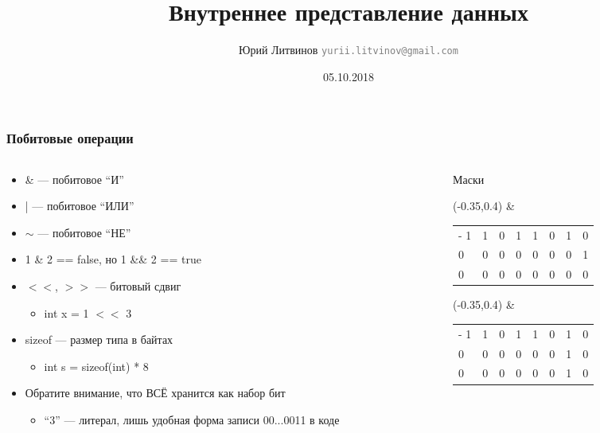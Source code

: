 \documentclass[xetex,mathserif,serif]{beamer}
\title{Внутреннее представление данных}
\author[Юрий Литвинов]{Юрий Литвинов \newline \textcolor{gray}{\small\texttt{yurii.litvinov@gmail.com}}}
\date{05.10.2018}
\begin{document}
	
	\frame{\titlepage}
	
	\begin{frame}
		\frametitle{Побитовые операции}
		\begin{columns}
			\begin{column}{0.6\textwidth}
				\begin{itemize}
					\item \& --- побитовое ``И''
					\item | --- побитовое ``ИЛИ''
					\item $\sim$ --- побитовое ``НЕ''
					\item 1 \& 2 == false, но 1 \&\& 2 == true
					\item $<<$, $>>$ --- битовый сдвиг
					\begin{itemize}
						\item int x = 1 $<<$ 3
					\end{itemize}
					\item sizeof --- размер типа в байтах
					\begin{itemize}
						\item int s = sizeof(int) * 8
					\end{itemize}
					\item Обратите внимание, что ВСЁ хранится как набор бит
					\begin{itemize}
						\item ``3'' --- литерал, лишь удобная форма записи 00...0011 в коде
					\end{itemize}
				\end{itemize}
			\end{column}
			\begin{column}{0.4\textwidth}
				Маски
				\vspace{3mm}
				\begin{textblock}{1}(-0.35,0.4)
					\&
				\end{textblock}
				\begin{tabu} {| X[1 l p] | X[1 l p] | X[1 l p] | X[1 l p] | X[1 l p] | X[1 l p] | X[1 l p] | X[1 l p] |}
					\tabucline-
					\everyrow{\tabucline-}
					1 & 1 & 0 & 1 & 1 & 0 & 1 & 0 \\
					0 & 0 & 0 & 0 & 0 & 0 & 0 & 1 \\
					0 & 0 & 0 & 0 & 0 & 0 & 0 & 0 \\
				\end{tabu}
				\vspace{0.5cm}

				\begin{textblock}{1}(-0.35,0.4)
					\&
				\end{textblock}
				\begin{tabu} {| X[1 l p] | X[1 l p] | X[1 l p] | X[1 l p] | X[1 l p] | X[1 l p] | X[1 l p] | X[1 l p] |}
					\tabucline-
					\everyrow{\tabucline-}
					1 & 1 & 0 & 1 & 1 & 0 & 1 & 0 \\
					0 & 0 & 0 & 0 & 0 & 0 & 1 & 0 \\
					0 & 0 & 0 & 0 & 0 & 0 & 1 & 0 \\
				\end{tabu}
			\end{column}
		\end{columns}
	\end{frame}
\end{document}
